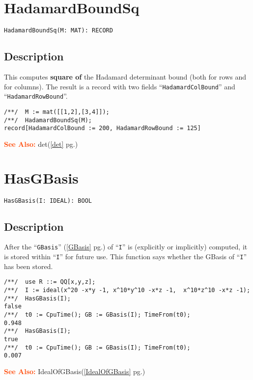 \documentclass[a4paper]{mybook}
\newenvironment{command}{}{} %
\newcommand\SeeAlso{\par\textcolor{OrangeRed}{\textbf{\large See Also: }}}
\begin{document}
\section{HadamardBoundSq}
\label{HadamardBoundSq}
\begin{command} %


\begin{Verbatim}[label=syntax, rulecolor=\color{MidnightBlue},
frame=single]
HadamardBoundSq(M: MAT): RECORD
\end{Verbatim}


\subsection*{Description}

This computes \textbf{square of} the Hadamard determinant bound (both for rows
and for columns).  The result is a record with two fields
``\verb&HadamardColBound&'' and ``\verb&HadamardRowBound&''.
\begin{Verbatim}[label=example, rulecolor=\color{PineGreen}, frame=single]
/**/  M := mat([[1,2],[3,4]]);
/**/  HadamardBoundSq(M);
record[HadamardColBound := 200, HadamardRowBound := 125]
\end{Verbatim}


\SeeAlso %
  det(\ref{det} pg.\pageref{det})
\end{command} %

\section{HasGBasis}
\label{HasGBasis}
\begin{command} %


\begin{Verbatim}[label=syntax, rulecolor=\color{MidnightBlue},
frame=single]
HasGBasis(I: IDEAL): BOOL
\end{Verbatim}


\subsection*{Description}

After the ``\verb&GBasis&'' (\ref{GBasis} pg.\pageref{GBasis}) of ``\verb&I&'' is (explicitly or implicitly)
computed, it is stored within ``\verb&I&'' for future use.
This function says whether the GBasis of ``\verb&I&'' has been stored.
\begin{Verbatim}[label=example, rulecolor=\color{PineGreen}, frame=single]
/**/  use R ::= QQ[x,y,z];
/**/  I := ideal(x^20 -x*y -1, x^10*y^10 -x*z -1,  x^10*z^10 -x*z -1);
/**/  HasGBasis(I);
false
/**/  t0 := CpuTime(); GB := GBasis(I); TimeFrom(t0);
0.948
/**/  HasGBasis(I);
true
/**/  t0 := CpuTime(); GB := GBasis(I); TimeFrom(t0);
0.007
\end{Verbatim}


\SeeAlso %
  IdealOfGBasis(\ref{IdealOfGBasis} pg.\pageref{IdealOfGBasis})
\end{command} %
\end{document}
